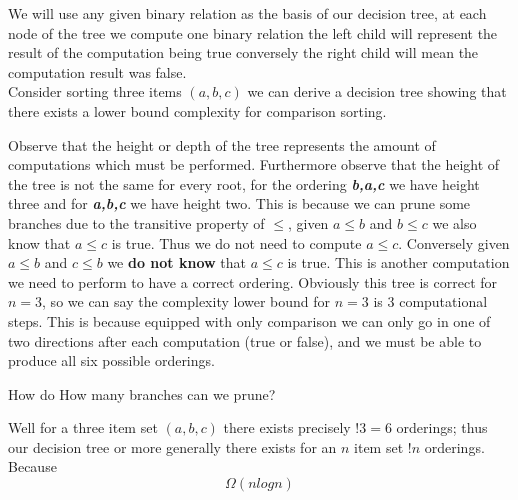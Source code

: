 We will use any given binary relation as the basis of our decision tree,
at each node of the tree we compute one binary relation
the left child will represent the result of the computation being true
conversely the right child will mean the computation result was false.
$$$$
Consider sorting three items $(a,b,c)$ we can derive a decision tree showing that
there exists a lower bound complexity for comparison sorting.

\begin{center}
\end{center}

Observe that the height or depth of the tree represents the amount of computations which must be performed.
Furthermore observe that the height of the tree is not the same for every root,
for the ordering \textbf{\textit{b,a,c}} we have height three
and for \textbf{\textit{a,b,c}} we have height two.
This is because we can prune some branches due to the transitive property of $\leq$,
given $a \leq b$ and $b \leq c$ we also know that $a \leq c$ is true.
Thus we do not need to compute $a \leq c$.
Conversely given $a \leq b$ and $c \leq b$ we \textbf{do not know} that $a \leq c$ is true.
This is another computation we need to perform to have a correct ordering.
Obviously this tree is correct for $n = 3$, so we can say
the complexity lower bound for $n = 3$ is 3 computational steps.
This is because equipped with only comparison we can only go in one
of two directions after each computation (true or false),
and we must be able to produce all six possible orderings.

How do
How many branches can we prune?

Well for a three item set $(a,b,c)$ there exists precisely $!3 = 6$ orderings;
thus our decision tree 
or more generally there exists for an $n$ item set $!n$ orderings.
Because
$$\Omega(n log n)$$


